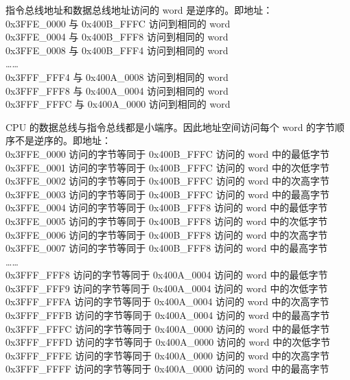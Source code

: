 \documentclass[main\_\_CN.tex]{subfiles}
\begin{document}
指令总线地址和数据总线地址访问的 word 是逆序的。即地址：\\
0x3FFE\_0000 与 0x400B\_FFFC 访问到相同的 word\\
0x3FFE\_0004 与 0x400B\_FFF8 访问到相同的 word\\
0x3FFE\_0008 与 0x400B\_FFF4 访问到相同的 word\\
……\\
0x3FFF\_FFF4 与 0x400A\_0008 访问到相同的 word\\
0x3FFF\_FFF8 与 0x400A\_0004 访问到相同的 word\\
0x3FFF\_FFFC 与 0x400A\_0000 访问到相同的 word

CPU 的数据总线与指令总线都是小端序。因此地址空间访问每个 word 的字节顺序不是逆序的。即地址：\\
0x3FFE\_0000 访问的字节等同于 0x400B\_FFFC 访问的 word 中的最低字节\\
0x3FFE\_0001 访问的字节等同于 0x400B\_FFFC 访问的 word 中的次低字节\\
0x3FFE\_0002 访问的字节等同于 0x400B\_FFFC 访问的 word 中的次高字节\\
0x3FFE\_0003 访问的字节等同于 0x400B\_FFFC 访问的 word 中的最高字节\\
0x3FFE\_0004 访问的字节等同于 0x400B\_FFF8 访问的 word 中的最低字节\\
0x3FFE\_0005 访问的字节等同于 0x400B\_FFF8 访问的 word 中的次低字节\\
0x3FFE\_0006 访问的字节等同于 0x400B\_FFF8 访问的 word 中的次高字节\\
0x3FFE\_0007 访问的字节等同于 0x400B\_FFF8 访问的 word 中的最高字节\\
……\\
0x3FFF\_FFF8 访问的字节等同于 0x400A\_0004 访问的 word 中的最低字节\\
0x3FFF\_FFF9 访问的字节等同于 0x400A\_0004 访问的 word 中的次低字节\\
0x3FFF\_FFFA 访问的字节等同于 0x400A\_0004 访问的 word 中的次高字节\\
0x3FFF\_FFFB 访问的字节等同于 0x400A\_0004 访问的 word 中的最高字节\\
0x3FFF\_FFFC 访问的字节等同于 0x400A\_0000 访问的 word 中的最低字节\\
0x3FFF\_FFFD 访问的字节等同于 0x400A\_0000 访问的 word 中的次低字节\\
0x3FFF\_FFFE 访问的字节等同于 0x400A\_0000 访问的 word 中的次高字节\\
0x3FFF\_FFFF 访问的字节等同于 0x400A\_0000 访问的 word 中的最高字节
\end{document}
